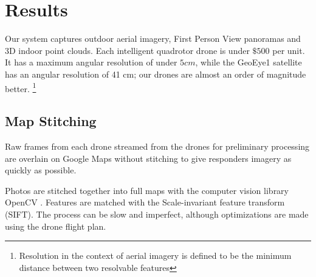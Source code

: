 
\section{Results}							%

Our system captures outdoor aerial imagery, First Person View panoramas and 3D indoor point clouds.
Each intelligent quadrotor drone is under $\$500$ per unit. It has a maximum angular resolution of under $5
cm$, while the GeoEye1 satellite has an angular resolution of 41 cm; our drones are almost an order of
magnitude better. \footnote{Resolution in the context of aerial imagery is defined to be the minimum distance between two resolvable features}

\subsection{Map Stitching}


Raw frames from each drone streamed from the drones for preliminary processing are overlain on Google Maps without stitching to give responders imagery as quickly as possible.



Photos are stitched together into full maps with the computer vision library OpenCV \cite{OpenCV:HomePage}. Features are matched with the Scale-invariant feature transform (SIFT). The process can be slow and imperfect, although optimizations are made using the drone flight plan.

